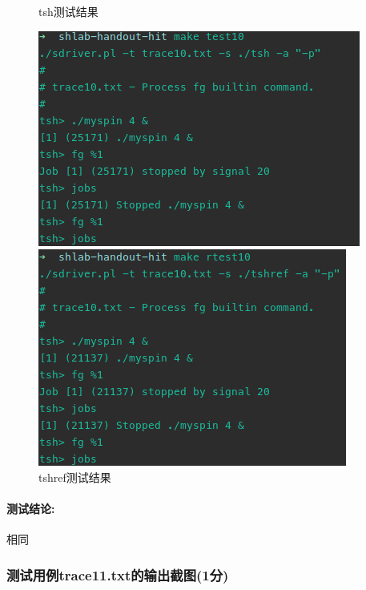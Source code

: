 \begin{figure}[H]
    \begin{minipage}[c]{0.5\linewidth}
        \centering
        \caption{tsh测试结果}
        \includegraphics[width=0.7\linewidth]{figures/test10.png}
    \end{minipage}
    \begin{minipage}[c]{0.5\linewidth}
        \centering
        \caption{tshref测试结果}
        \includegraphics[width=0.65\linewidth]{figures/rtest10.png}
    \end{minipage}
\end{figure}

\paragraph{测试结论:}相同

\subsubsection{测试用例trace11.txt的输出截图(1分)}

